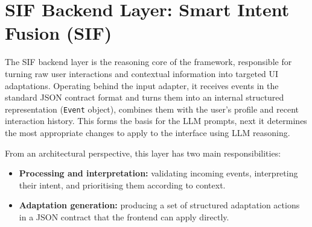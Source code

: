 \documentclass[openany]{book}
\begin{document}
    
\section{SIF Backend Layer: Smart Intent Fusion (SIF)}

The SIF backend layer is the reasoning core of the framework, responsible for turning raw user interactions and contextual information into targeted UI adaptations. Operating behind the input adapter, it receives events in the standard JSON contract format and turns them into an internal structured representation (\texttt{Event} object), combines them with the user’s profile and recent interaction history. This forms the basis for the LLM prompts, next it determines the most appropriate changes to apply to the interface using LLM reasoning.

From an architectural perspective, this layer has two main responsibilities:
\begin{itemize}
    \item \textbf{Processing and interpretation:} validating incoming events, interpreting their intent, and prioritising them according to context.
    \item \textbf{Adaptation generation:} producing a set of structured adaptation actions in a JSON contract that the frontend can apply directly.
\end{itemize}
\end{document}
